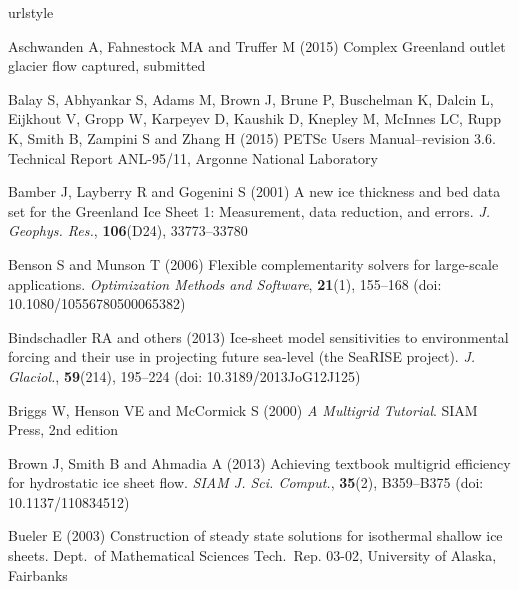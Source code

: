 \documentclass[review,letterpaper]{igs}
\begin{document}
\begin{thebibliography}{42}
\providecommand{\natexlab}[1]{#1}
\expandafter\ifx\csname urlstyle\endcsname\relax
  \providecommand{\doi}[1]{doi: \discretionary{}{}{}#1}\else
  \providecommand{\doi}{doi: \discretionary{}{}{}\begingroup
  \urlstyle{rm}\Url}\fi

Aschwanden A, Fahnestock MA and Truffer M (2015) Complex {G}reenland outlet
  glacier flow captured, submitted

Balay S, Abhyankar S, Adams M, Brown J, Brune P, Buschelman K, Dalcin L,
  Eijkhout V, Gropp W, Karpeyev D, Kaushik D, Knepley M, McInnes LC, Rupp K,
  Smith B, Zampini S and Zhang H (2015) {PETS}c {U}sers {M}anual--revision 3.6.
  Technical Report ANL-95/11, Argonne National Laboratory

Bamber J, Layberry R and Gogenini S (2001) A new ice thickness and bed data set
  for the {Greenland Ice Sheet} 1: {M}easurement, data reduction, and errors.
  \emph{J. Geophys. Res.}, \textbf{106}(D24), 33773--33780

Benson S and Munson T (2006) Flexible complementarity solvers for large-scale
  applications. \emph{Optimization Methods and Software}, \textbf{21}(1),
  155--168 (\doi {10.1080/10556780500065382})

Bindschadler RA and others (2013) Ice-sheet model sensitivities to
  environmental forcing and their use in projecting future sea-level (the
  {S}ea{RISE} project). \emph{J. Glaciol.}, \textbf{59}(214), 195--224 (\doi
  {10.3189/2013JoG12J125})

Briggs W, Henson VE and McCormick S (2000) \emph{A {M}ultigrid {T}utorial}.
  SIAM Press, 2nd edition

Brown J, Smith B and Ahmadia A (2013) Achieving textbook multigrid efficiency
  for hydrostatic ice sheet flow. \emph{SIAM J. Sci. Comput.}, \textbf{35}(2),
  B359--B375 (\doi {10.1137/110834512})

Bueler E (2003) Construction of steady state solutions for isothermal shallow
  ice sheets. Dept.~of Mathematical Sciences Tech.~Rep. 03-02, University of
  Alaska, Fairbanks


\end{thebibliography}
\end{document}
